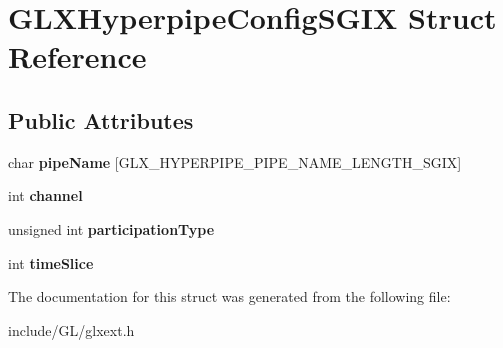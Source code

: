 \hypertarget{structGLXHyperpipeConfigSGIX}{\section{\-G\-L\-X\-Hyperpipe\-Config\-S\-G\-I\-X \-Struct \-Reference}
\label{structGLXHyperpipeConfigSGIX}
}
\subsection*{\-Public \-Attributes}
\begin{DoxyCompactItemize}
\item 
\hypertarget{structGLXHyperpipeConfigSGIX_a9e3748f92005cac81cb44d4c67acccb8}{char {\bfseries pipe\-Name} \mbox{[}\-G\-L\-X\-\_\-\-H\-Y\-P\-E\-R\-P\-I\-P\-E\-\_\-\-P\-I\-P\-E\-\_\-\-N\-A\-M\-E\-\_\-\-L\-E\-N\-G\-T\-H\-\_\-\-S\-G\-I\-X\mbox{]}}\label{structGLXHyperpipeConfigSGIX_a9e3748f92005cac81cb44d4c67acccb8}

\item 
\hypertarget{structGLXHyperpipeConfigSGIX_abc812d8796ba89d5de4e33b3532d8335}{int {\bfseries channel}}\label{structGLXHyperpipeConfigSGIX_abc812d8796ba89d5de4e33b3532d8335}

\item 
\hypertarget{structGLXHyperpipeConfigSGIX_a093cfaaec305531f66e1120929b5b01b}{unsigned int {\bfseries participation\-Type}}\label{structGLXHyperpipeConfigSGIX_a093cfaaec305531f66e1120929b5b01b}

\item 
\hypertarget{structGLXHyperpipeConfigSGIX_afe9288e75dc1ae5e0f33eff978d7024d}{int {\bfseries time\-Slice}}\label{structGLXHyperpipeConfigSGIX_afe9288e75dc1ae5e0f33eff978d7024d}

\end{DoxyCompactItemize}


\-The documentation for this struct was generated from the following file\-:\begin{DoxyCompactItemize}
\item 
include/\-G\-L/glxext.\-h\end{DoxyCompactItemize}

